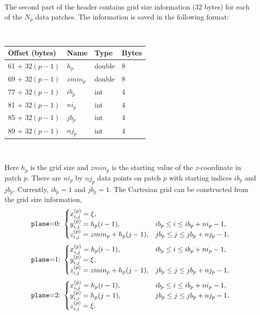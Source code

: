 \documentclass[11pt]{report}
\begin{document}
The second part of the header contains grid size information (32 bytes)
for each of the $N_p$ data patches. The information is saved in the following format:
{\samepage
\begin{center}
\hspace{-35mm}{\tt for ($p=1$; $p\leq N_p$; $p$++)}\nopagebreak \\ 
\vspace{2mm}
\begin{tabular}{llll}\hline
Offset (bytes) & Name & Type & Bytes \\ \hline
61 + $32(p - 1)$ & $h_{p}$ & double & 8 \\ \hline
69 + $32(p - 1)$ & $zmin_{p}$ & double & 8 \\ \hline
77 + $32(p - 1)$ & $ib_{p}$ & int & 4 \\ \hline
81 + $32(p - 1)$ & $ni_{p}$ & int & 4 \\ \hline
85 + $32(p - 1)$ & $jb_{p}$ & int & 4 \\ \hline
89 + $32(p - 1)$ & $nj_{p}$ & int & 4 \\ \hline
\end{tabular}\\
\end{center}
}
Here $h_p$ is the grid size and $zmin_p$ is the starting value of the $z$-coordinate in patch
$p$. There are $ni_p$ by $nj_p$ data points on patch $p$ with starting indices $ib_p$ and
$jb_p$. Currently, $ib_p=1$ and $jb_p=1$. The Cartesian grid can be constructed from the
grid size information,
\[
\mbox{{\tt plane}=0:}\ \begin{cases}
x^{(p)}_{i,j} = \xi,\\
y^{(p)}_{i,j} = h_p(i-1),& ib_p\leq i\leq ib_p+ni_p-1,\\
z^{(p)}_{i,j} = zmin_p + h_p(j-1),& jb_p\leq j\leq jb_p+nj_p-1,
\end{cases}
\]
\[
\mbox{{\tt plane}=1:}\ \begin{cases}
x^{(p)}_{i,j} = h_p(i-1),& ib_p\leq i\leq ib_p+ni_p-1,\\
y^{(p)}_{i,j} = \xi,\\
z^{(p)}_{i,j} = zmin_p + h_p(j-1),& jb_p\leq j\leq jb_p+nj_p-1,
\end{cases}
\]
\[
\mbox{{\tt plane}=2:}\ \begin{cases}
x^{(p)}_{i,j} = h_p(i-1),& \qquad \qquad ib_p\leq i\leq ib_p+ni_p-1, \\
y^{(p)}_{i,j} = h_p(j-1),& \qquad \qquad jb_p\leq j\leq jb_p+nj_p-1, \\
z^{(p)}_{i,j} = \xi.
\end{cases}
\]
\end{document}
